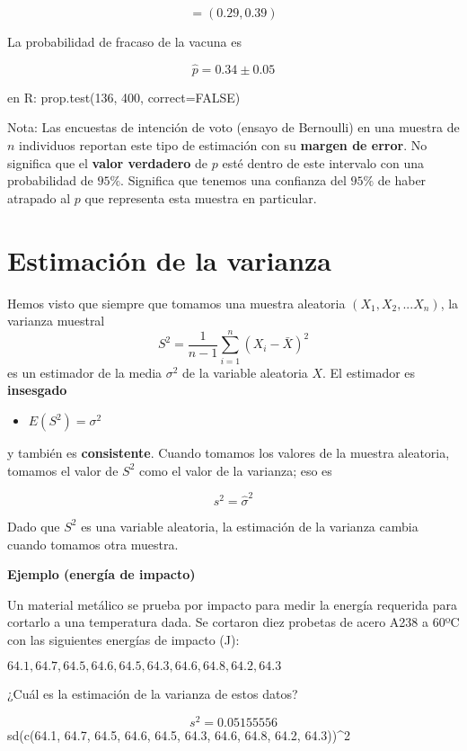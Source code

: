 \documentclass[
]{book}
\providecommand{\tightlist}{%
  \setlength{\itemsep}{0pt}\setlength{\parskip}{0pt}}
\begin{document}
\[=(0.29,0.39)\]

La probabilidad de fracaso de la vacuna es

\[\hat{p}=0.34 \pm 0.05\]

en R: prop.test(136, 400, correct=FALSE)

Nota: Las encuestas de intención de voto (ensayo de Bernoulli) en una muestra de \(n\) individuos reportan este tipo de estimación con su \textbf{margen de error}. No significa que el \textbf{valor verdadero} de \(p\) esté dentro de este intervalo con una probabilidad de \(95\%\). Significa que tenemos una confianza del \(95\%\) de haber atrapado al \(p\) que representa esta muestra en particular.

\hypertarget{estimaciuxf3n-de-la-varianza}{%
\section{Estimación de la varianza}\label{estimaciuxf3n-de-la-varianza}}

Hemos visto que siempre que tomamos una muestra aleatoria \((X_1, X_2, ... X_n)\), la varianza muestral
\[S^2=\frac{1}{n-1}\sum_{i=1}^n (X_i-\bar{X})^2\]
es un estimador de la media \(\sigma^2\) de la variable aleatoria \(X\). El estimador es \textbf{insesgado}

\begin{itemize}
\tightlist
\item
  \(E(S^2)=\sigma^2\)
\end{itemize}

y también es \textbf{consistente}. Cuando tomamos los valores de la muestra aleatoria, tomamos el valor de \(S^2\) como el valor de la varianza; eso es

\[s^2=\hat{\sigma}^2\]

Dado que \(S^2\) es una variable aleatoria, la estimación de la varianza cambia cuando tomamos otra muestra.

\textbf{Ejemplo (energía de impacto)}

Un material metálico se prueba por impacto para medir la energía requerida para cortarlo a una temperatura dada. Se cortaron diez probetas de acero A238 a 60ºC con las siguientes energías de impacto (J):

\(64.1, 64.7, 64.5, 64.6, 64.5, 64.3, 64.6, 64.8, 64.2, 64.3\)

¿Cuál es la estimación de la varianza de estos datos?

\[s^2=0.05155556\]
sd(c(64.1, 64.7, 64.5, 64.6, 64.5, 64.3, 64.6, 64.8, 64.2, 64.3))\^{}2
\end{document}
